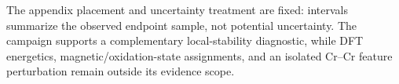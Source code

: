 The appendix placement and uncertainty treatment are fixed: intervals summarize the observed endpoint sample, not potential uncertainty. The campaign supports a complementary local-stability diagnostic, while DFT energetics, magnetic/oxidation-state assignments, and an isolated Cr--Cr feature perturbation remain outside its evidence scope.

